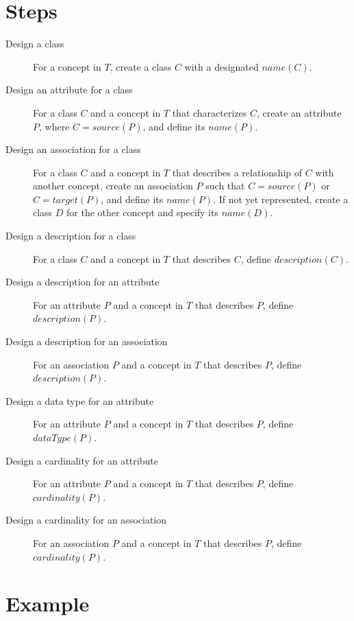\section{Steps}
\label{modeling_steps}
\begin{description}
\item [Design a class] For a concept in $T$, create a class $C$ with a designated $name(C)$.

\item[Design an attribute for a class] For a class $C$ and a concept in $T$ that characterizes $C$, create an attribute $P$, where $C = source(P)$, and define its $name(P)$.

\item[Design an association for a class] For a class $C$ and a concept in $T$ that describes a relationship of $C$ with another concept, create an association $P$ such that $C = source(P)$ or $C = target(P)$, and define its $name(P)$. If not yet represented, create a class $D$ for the other concept and specify its $name(D)$.

\item [Design a description for a class] For a class $C$ and a concept in $T$ that describes $C$, define $description(C)$.

\item [Design a description for an attribute] For an attribute $P$ and a concept in $T$ that describes $P$, define $description(P)$.

\item [Design a description for an association] For an association $P$ and a concept in $T$ that describes $P$, define $description(P)$.

\item [Design a data type for an attribute] For an attribute $P$ and a concept in $T$ that describes $P$, define $dataType(P)$.

\item [Design a cardinality for an attribute] For an attribute $P$ and a concept in $T$ that describes $P$, define $cardinality(P)$.

\item [Design a cardinality for an association] For an association $P$ and a concept in $T$ that describes $P$, define $cardinality(P)$.
\end{description}


\section{Example}

